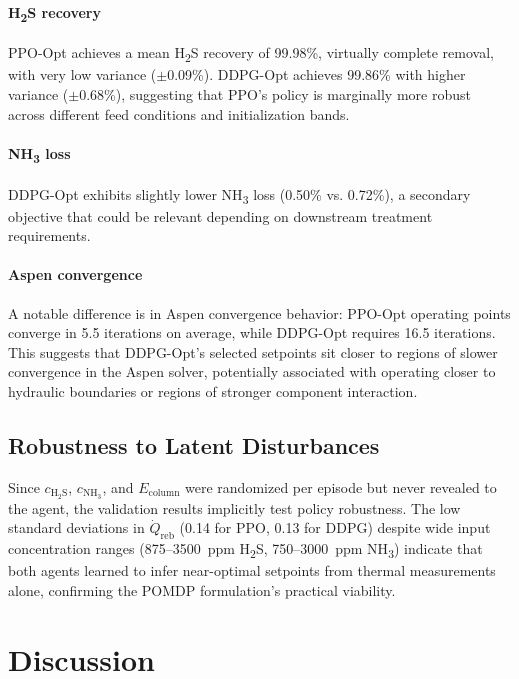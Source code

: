 \documentclass[journal,10pt,twocolumn]{IEEEtran}
\begin{document}
\paragraph{H\textsubscript{2}S recovery} PPO-Opt achieves a mean H\textsubscript{2}S recovery of 99.98\%, virtually complete removal, with very low variance ($\pm$0.09\%). DDPG-Opt achieves 99.86\% with higher variance ($\pm$0.68\%), suggesting that PPO's policy is marginally more robust across different feed conditions and initialization bands.

\paragraph{NH\textsubscript{3} loss} DDPG-Opt exhibits slightly lower NH\textsubscript{3} loss (0.50\% vs. 0.72\%), a secondary objective that could be relevant depending on downstream treatment requirements.

\paragraph{Aspen convergence} A notable difference is in Aspen convergence behavior: PPO-Opt operating points converge in 5.5 iterations on average, while DDPG-Opt requires 16.5 iterations. This suggests that DDPG-Opt's selected setpoints sit closer to regions of slower convergence in the Aspen solver, potentially associated with operating closer to hydraulic boundaries or regions of stronger component interaction.

\subsection{Robustness to Latent Disturbances}
\label{ssec:robustness}

Since $c_\mathrm{H_2S}$, $c_\mathrm{NH_3}$, and $E_\text{column}$ were randomized per episode but never revealed to the agent, the validation results implicitly test policy robustness. The low standard deviations in $\dot{Q}_\text{reb}$ (0.14 for PPO, 0.13 for DDPG) despite wide input concentration ranges (875--3500~ppm H\textsubscript{2}S, 750--3000~ppm NH\textsubscript{3}) indicate that both agents learned to infer near-optimal setpoints from thermal measurements alone, confirming the POMDP formulation's practical viability.

\section{Discussion}
\label{sec:discussion}
\end{document}
